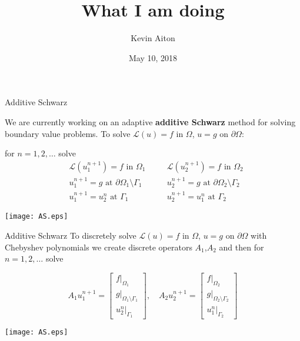 \documentclass{beamer}
\title[What I've done]{What I am doing}
\author[K. Aiton]{Kevin Aiton}
\institute[UD]{
  Department of Mathematics\\
University of Delaware\\
}
\date[November 2017]{May 10, 2018}
\begin{document}
%
%
\begin{frame}[plain]
  \titlepage
\end{frame}

\begin{frame}{Additive Schwarz}

		We are currently working on an adaptive \textbf{additive Schwarz} method for solving boundary value problems. To solve $\mathcal{L}(u)=f$ in $\Omega$, $u=g$ on $\partial \Omega$:
\bigskip


	\begin{center}
	for $n=1,2,\dots$ solve
	\begin{equation*}
	\begin{aligned}
	&\mathcal{L}(u_1^{n+1})=f \text{ in } \Omega_1\\
	&u_1^{n+1} = g \text{ at } \partial\Omega_1 \setminus \Gamma_1 \\
	&u_1^{n+1} = u_2^{n} \text{ at } \Gamma_1	\end{aligned} \quad 	\begin{aligned}
	&\mathcal{L}(u_2^{n+1})=f \text{ in } \Omega_2 \\
	&u_2^{n+1} = g \text{ at } \partial\Omega_2 \setminus \Gamma_2  \\
	&u_2^{n+1} = u_1^{n} \text{ at } \Gamma_2 \end{aligned}
	\end{equation*}	
	\end{center}

\begin{center}
		\texttt{[image: AS.eps]}
\end{center}


\end{frame}

\begin{frame}{Additive Schwarz}
		To discretely solve $\mathcal{L}(u)=f$ in $\Omega$, $u=g$ on $\partial \Omega$ with Chebyshev polynomials we create discrete operators $A_1$,$A_2$ and then for $n=1,2,\dots$ solve
		\begin{center}
	\begin{equation*}
A_1 u_1^{n+1} =  \begin{bmatrix} 
  f\rvert_{\Omega_1} \\ g\rvert_{\Omega_1 \setminus \Gamma_1} \\ u_2^{n} \rvert_{\Gamma_1}
  \end{bmatrix}, \quad A_2 u_2^{n+1} =  \begin{bmatrix} 
  f\rvert_{\Omega_2} \\ g\rvert_{\Omega_2 \setminus \Gamma_2} \\ u_1^{n} \rvert_{\Gamma_2}
  \end{bmatrix}
	\end{equation*}
	\end{center}

\begin{center}
		\texttt{[image: AS.eps]}
\end{center}


\end{frame}
\end{document}
